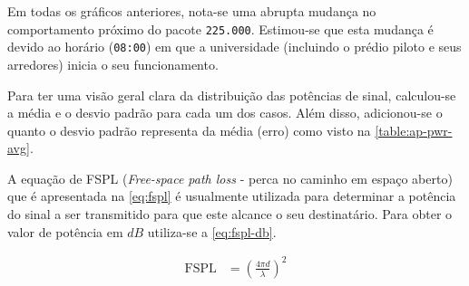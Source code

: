 Em todas os gráficos anteriores, nota-se uma abrupta mudança no comportamento
próximo do pacote \texttt{225.000}. Estimou-se que esta mudança é devido ao
horário (\texttt{08:00}) em que a universidade (incluindo o prédio piloto e seus
arredores) inicia o seu funcionamento.

Para ter uma visão geral clara da distribuição das potências de sinal,
calculou-se a média e o desvio padrão para cada um dos casos. Além disso,
adicionou-se o quanto o desvio padrão representa da média (erro) como visto na
\autoref{table:ap-pwr-avg}.

\begin{table}[htb]
\end{table}

\FloatBarrier

A equação de FSPL (\emph{Free-space path loss} - perca no caminho em espaço
aberto) que é apresentada na \autoref{eq:fspl} é usualmente utilizada para
determinar a potência do sinal a ser transmitido para que este alcance o seu
destinatário. Para obter o valor de potência em $dB$ utiliza-se a
\autoref{eq:fspl-db}.

\begin{align}
	\mbox{FSPL}		&= \left ( \frac{4\pi d}{\lambda} \right )^2  \label{eq:fspl}
\end{align}

